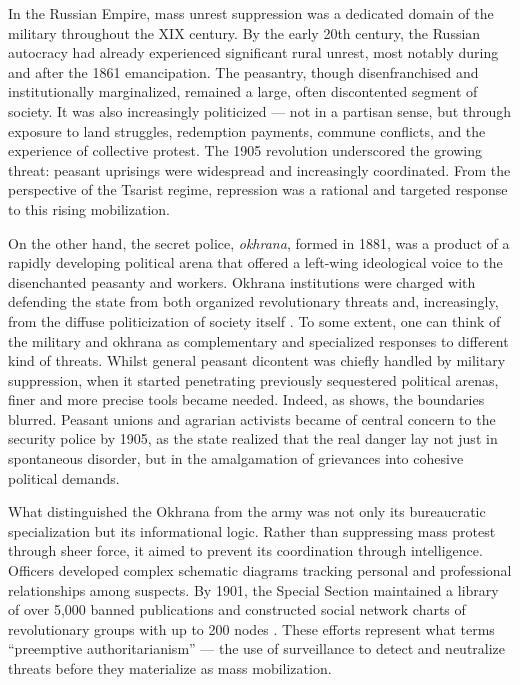 \documentclass[10pt]{scrarticle}
\begin{document}
In the Russian Empire, mass unrest suppression was a dedicated domain of the military throughout the XIX century. By the early 20th century, the Russian autocracy had already experienced significant rural unrest, most notably during and after the 1861 emancipation. The peasantry, though disenfranchised and institutionally marginalized, remained a large, often discontented segment of society. It was also increasingly politicized — not in a partisan sense, but through exposure to land struggles, redemption payments, commune conflicts, and the experience of collective protest. The 1905 revolution underscored the growing threat: peasant uprisings were widespread and increasingly coordinated. From the perspective of the Tsarist regime, repression was a rational and targeted response to this rising mobilization.

On the other hand, the secret police, \textit{okhrana}, formed in 1881, was a product of a rapidly developing political arena that offered a left-wing ideological voice to the disenchanted peasanty and workers. Okhrana institutions were charged with defending the state from both organized revolutionary threats and, increasingly, from the diffuse politicization of society itself \parencite{daly_autocracy_1998}. To some extent, one can think of the military and okhrana as complementary and specialized responses to different kind of threats. Whilst general peasant dicontent was chiefly handled by military suppression, when it started penetrating previously sequestered political arenas, finer and more precise tools became needed. Indeed, as \cite{daly_autocracy_1998} shows, the boundaries blurred. Peasant unions and agrarian activists became of central concern to the security police by 1905, as the state realized that the real danger lay not just in spontaneous disorder, but in the amalgamation of grievances into cohesive political demands.

What distinguished the Okhrana from the army was not only its bureaucratic specialization but its informational logic. Rather than suppressing mass protest through sheer force, it aimed to prevent its coordination through intelligence. Officers developed complex schematic diagrams tracking personal and professional relationships among suspects. By 1901, the Special Section maintained a library of over 5,000 banned publications and constructed social network charts of revolutionary groups with up to 200 nodes \parencite{daly_autocracy_1998}. These efforts represent what \cite{dimitrov_why_2013} terms ``preemptive authoritarianism'' — the use of surveillance to detect and neutralize threats before they materialize as mass mobilization.
\end{document}
